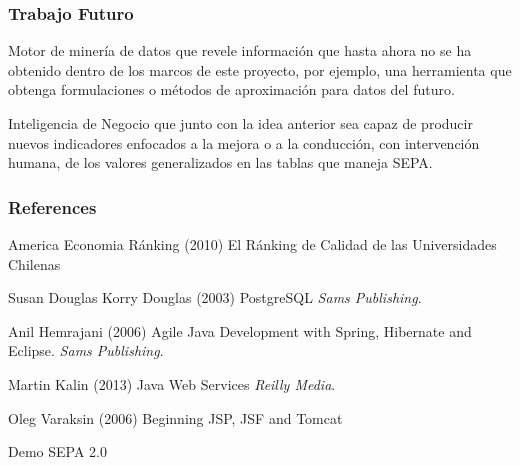\documentclass{beamer}
\begin{document}

\begin{frame}
\frametitle{Trabajo Futuro}
\begin{block}{}
Motor de minería de datos que revele información que hasta ahora no se ha obtenido dentro de los marcos de este proyecto, por ejemplo, una herramienta que obtenga formulaciones o métodos de aproximación para datos del futuro.
\end{block}
\begin{block}{}
Inteligencia de Negocio que junto con la idea anterior sea capaz de producir nuevos indicadores enfocados a la mejora o a la conducción, con intervención humana, de los valores generalizados en las tablas que maneja SEPA.
\end{block}
\end{frame}


\begin{frame}
\frametitle{References}
\footnotesize{
\begin{thebibliography}{99} %
 America Economia Ránking (2010)
\newblock El Ránking de Calidad de las Universidades Chilenas
\end{thebibliography}

\begin{thebibliography}{99} %
 Susan Douglas Korry Douglas (2003)
\newblock PostgreSQL
\newblock \emph{Sams Publishing}.
\end{thebibliography}

\begin{thebibliography}{99} %
 Anil Hemrajani (2006)
\newblock Agile Java Development with Spring, Hibernate and Eclipse.
\newblock \emph{Sams Publishing}.
\end{thebibliography}

\begin{thebibliography}{99} %
 Martin Kalin (2013)
\newblock Java Web Services
\newblock \emph{Reilly Media}.
\end{thebibliography}

\begin{thebibliography}{99} %
 Oleg Varaksin (2006)
\newblock Beginning JSP, JSF and Tomcat
\end{thebibliography}
}
\end{frame}


\begin{frame}
\Huge{\centerline{Demo SEPA 2.0}}
\end{frame}

\end{document}
